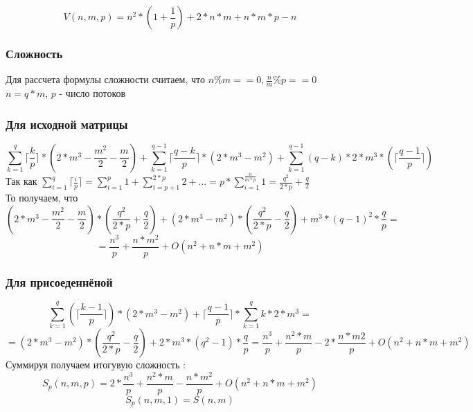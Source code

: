 \documentclass[a4paper,12pt]{article}
\begin{document}
$$V(n, m, p) = n^{2}*(1 + \frac{1}{p}) + 2*n*m + n*m*p - n$$

\subsubsection{Сложность}
Для рассчета формулы сложности считаем, что $n \% m == 0, \frac{n}{m} \% p == 0$\\
$n = q * m$, $p$ - число потоков\\
\subsubsection{Для исходной матрицы}
$$\sum\limits_{k=1}^{q}\lceil \frac{k}{p} \rceil * (2 * m^{3} - \frac{m^{2}}{2} - \frac{m}{2}) +
\sum\limits_{k=1}^{q-1}\lceil \frac{q-k}{p} \rceil*(2*m^{3}-m^{2}) +
\sum\limits_{k=1}^{q-1} (q-k)*2*m^{3} * (\lceil \frac{q-1}{p} \rceil)$$
Так как $\sum\limits_{i=1}^{q}\lceil \frac{i}{p} \rceil =
\sum\limits_{i=1}^{p}1 + \sum\limits_{i=p+1}^{2*p}2 + ... = p * \sum\limits_{i=1}^{\frac{n}{m*p}}
1 = \frac{q^{2}}{2*p} + \frac{q}{2}$\\
То получаем, что 
$$(2*m^{3} - \frac{m^{2}}{2} - \frac{m}{2})*(\frac{q^{2}}{2*p} + \frac{q}{2}) + 
(2*m^{3} - m^{2}) *(\frac{q^{2}}{2*p} - \frac{q}{2}) + m^{3}*(q-1)^{2}*\frac{q}{p} = $$
$$ = \frac{n^{3}}{p} + \frac{n*m^{2}}{p} + O(n^{2} + n*m + m^{2})$$
\subsubsection{Для присоеденнёной}
$$\sum\limits_{k=1}^{q}(\lceil \frac{k-1}{p} \rceil)* (2*m^{3}-m^{2}) + \lceil \frac{q-1}{p}
\rceil * \sum\limits_{k=1}^{q}k*2*m^{3} = $$
$$= (2*m^{3} - m^{2}) * (\frac{q^{2}}{2*p}-\frac{q}{2}) + 2*m^{3}*(q^{2}-1)*\frac{q}{p} =
\frac{n^{3}}{p} + \frac{n^{2}*m}{p} - 2*\frac{n*m{2}}{p} + O(n^{2} + n*m + m^{2})$$
Суммируя получаем итогувую сложность :\\
$$S_{p}(n, m , p) = 2 * \frac{n^{3}}{p} + \frac{n^{2}*m}{p} - \frac{n*m^{2}}{p} +
O(n^{2} + n*m + m^{2})$$
$$S_{p}(n,m,1) = S(n, m)$$
\end{document}
